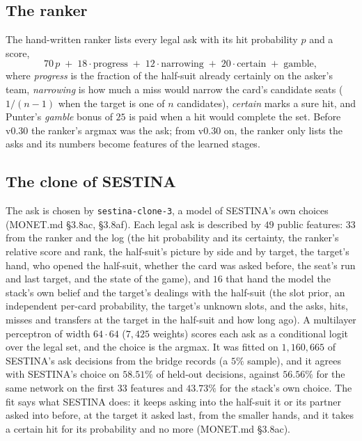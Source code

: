 \documentclass[11pt]{article}
\newcommand{\code}[1]{\texttt{#1}}
\newcommand{\monet}{MONET.md}
\newcommand{\sect}[1]{\S#1}
\begin{document}
\subsection{The ranker}

The hand-written ranker lists every legal ask with its hit probability $p$ and a score,
\[
  70\,p \;+\; 18\cdot\text{progress} \;+\; 12\cdot\text{narrowing} \;+\; 20\cdot\text{certain} \;+\; \text{gamble},
\]
where \emph{progress} is the fraction of the half-suit already certainly on the asker's team,
\emph{narrowing} is how much a miss would narrow the card's candidate seats ($1/(n-1)$ when the target
is one of $n$ candidates), \emph{certain} marks a sure hit, and Punter's \emph{gamble} bonus of $25$ is
paid when a hit would complete the set. Before v0.30
the ranker's argmax was the ask; from v0.30 on, the ranker only lists the asks and its numbers become
features of the learned stages.

\subsection{The clone of SESTINA}

The ask is chosen by \code{sestina-clone-3}, a model of SESTINA's own choices (\monet{} \sect{3.8ac},
\sect{3.8af}). Each legal ask is described by $49$ public features: $33$ from the ranker and the log
(the hit probability and its certainty, the ranker's relative score and rank, the half-suit's picture
by side and by target, the target's hand, who opened the half-suit, whether the card was asked before,
the seat's run and last target, and the state of the game), and $16$ that hand the model the stack's
own belief and the target's dealings with the half-suit (the slot prior, an independent per-card
probability, the target's unknown slots, and the asks, hits, misses and transfers at the target in the
half-suit and how long ago). A multilayer perceptron of width $64\cdot64$ ($7{,}425$ weights) scores
each ask as a conditional logit over the legal set, and the choice is the argmax. It was fitted on
$1{,}160{,}665$ of SESTINA's ask decisions from the bridge records (a $5\%$ sample), and it agrees with
SESTINA's choice on $58.51\%$ of held-out decisions, against $56.56\%$ for the same network on the
first $33$ features and $43.73\%$ for the stack's own choice. The fit says what SESTINA
does: it keeps asking into the half-suit it or its partner asked into before, at the target it asked
last, from the smaller hands, and it takes a certain hit for its probability and no more
(\monet{} \sect{3.8ac}).
\end{document}
